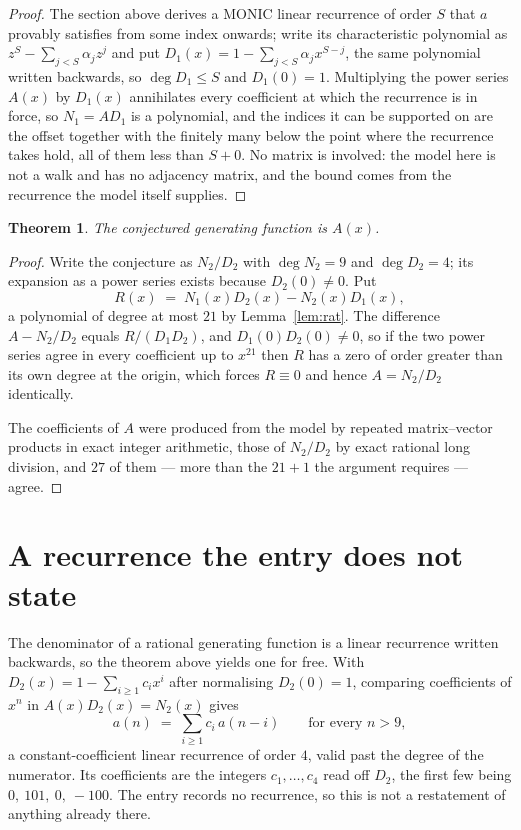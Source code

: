 \documentclass[11pt,a4paper]{article}
\theoremstyle{plain}
\newtheorem{theorem}{Theorem}
\theoremstyle{definition}
\begin{document}
\begin{proof}
The section above derives a MONIC linear recurrence of order $S$ that $a$ provably satisfies
from some index onwards; write its characteristic polynomial as $z^S-\sum_{j<S}\alpha_jz^j$
and put $D_1(x)=1-\sum_{j<S}\alpha_jx^{S-j}$, the same polynomial written backwards, so
$\deg D_1\le S$ and $D_1(0)=1$. Multiplying the power series $A(x)$ by $D_1(x)$ annihilates
every coefficient at which the recurrence is in force, so $N_1=AD_1$ is a polynomial, and the
indices it can be supported on are the offset together with the finitely many below the point
where the recurrence takes hold, all of them less than $S+0$. No matrix is involved: the
model here is not a walk and has no adjacency matrix, and the bound comes from the recurrence
the model itself supplies.
\end{proof}

\begin{theorem}
The conjectured generating function is $A(x)$.
\end{theorem}

\begin{proof}
Write the conjecture as $N_2/D_2$ with $\deg N_2=9$ and $\deg D_2=4$; its expansion as a
power series exists because $D_2(0)\neq0$. Put
\[
R(x)\;=\;N_1(x)D_2(x)-N_2(x)D_1(x),
\]
a polynomial of degree at most $21$ by Lemma~\ref{lem:rat}. The difference
$A-N_2/D_2$ equals $R/(D_1D_2)$, and $D_1(0)D_2(0)\neq0$, so if the two power series agree in
every coefficient up to $x^{21}$ then $R$ has a zero of order greater than its own
degree at the origin, which forces $R\equiv0$ and hence $A=N_2/D_2$ identically.

The coefficients of $A$ were produced from the model by repeated matrix--vector products in
exact integer arithmetic, those of $N_2/D_2$ by exact rational long division, and $27$
of them --- more than the $21+1$ the argument requires --- agree.
\end{proof}

\section{A recurrence the entry does not state}

The denominator of a rational generating function is a linear recurrence written backwards, so
the theorem above yields one for free. With $D_2(x)=1-\sum_{i\ge1}c_ix^i$ after normalising
$D_2(0)=1$, comparing coefficients of $x^n$ in $A(x)D_2(x)=N_2(x)$ gives
\[
a(n)\;=\;\sum_{i\ge1}c_i\,a(n-i)\qquad\text{for every }n>9,
\]
a constant-coefficient linear recurrence of order $4$, valid past the degree of the
numerator. Its coefficients are the integers $c_1,\dots,c_{4}$ read off $D_2$, the first few being $0,\ 101,\ 0,\ -100$. The entry records no recurrence, so this is not a restatement of anything
already there.
\end{document}
